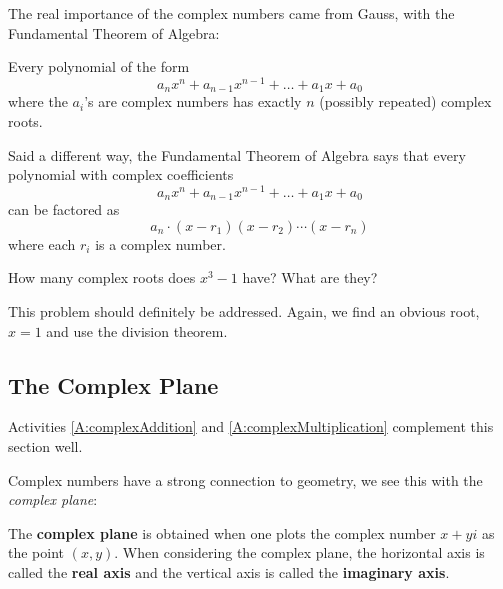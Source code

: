 The real importance of the complex numbers came from
Gauss, with the Fundamental Theorem of Algebra:

\begin{theorem}
 Every polynomial of the form
\[
 a_n x^n + a_{n-1} x^{n-1} + \dots + a_1 x + a_0
\]
where the $a_i$'s are complex numbers has exactly $n$ (possibly
repeated) complex roots.
\end{theorem}

Said a different way, the Fundamental Theorem of Algebra says that
every polynomial with complex coefficients
\[
a_n x^n + a_{n-1} x^{n-1} + \dots + a_1 x + a_0
\]
can be factored as 
\[
a_n\cdot (x-r_1)(x-r_2) \cdots (x-r_n)
\]
where each $r_i$ is a complex number.

\begin{question} 
How many complex roots does $x^3-1$ have? What are they?
\end{question}
\QM

\begin{teachingnote}
This problem should definitely be addressed. Again, we find an
obvious root, $x=1$ and use the division theorem.
\end{teachingnote}



\subsection{The Complex Plane}


\begin{activitynote}
Activities \ref{A:complexAddition} and \ref{A:complexMultiplication}
complement this section well.
\end{activitynote}

Complex numbers have a strong connection to geometry, we see this with
the \textit{complex plane}:

\begin{definition}
The \textbf{complex plane} is obtained when one
plots the complex number $x + yi$ as the point $(x,y)$. When
considering the complex plane, the horizontal axis is called the
\textbf{real axis} and the vertical axis is called the
\textbf{imaginary axis}.
\end{definition}

